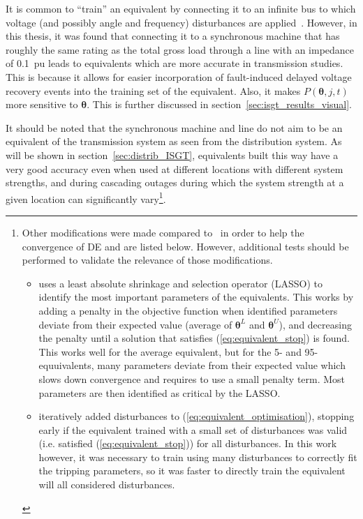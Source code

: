 

It is common to ``train'' an equivalent by connecting it to an infinite bus to which voltage (and possibly angle and frequency) disturbances are applied~\cite{ChaspierreThesis, CIGREloadModels, fulgencio}. However, in this thesis, it was found that connecting it to a synchronous machine that has roughly the same rating as the total gross load through a line with an impedance of 0.1~pu leads to equivalents which are more accurate in transmission studies. This is because it allows for easier incorporation of fault-induced delayed voltage recovery events into the training set of the equivalent. Also, it makes \(P(\bm{\theta}, j, t)\) more sensitive to \(\bm{\theta}\). This is further discussed in section~\ref{sec:isgt_results_visual}.

It should be noted that the synchronous machine and line do not aim to be an equivalent of the transmission system as seen from the distribution system. As will be shown in section~\ref{sec:distrib_ISGT}, equivalents built this way have a very good accuracy even when used at different locations with different system strengths, and during cascading outages during which the system strength at a given location can significantly vary\footnote{Other modifications were made compared to~\cite{ChaspierreThesis} in order to help the convergence of DE and are listed below. However, additional tests should be performed to validate the relevance of those modifications.
\begin{itemize}
    \item \cite{ChaspierreThesis} uses a least absolute shrinkage and selection operator (LASSO) to identify the most important parameters of the equivalents. This works by adding a penalty in the objective function when identified parameters deviate from their expected value (average of \(\bm{\theta}^L\) and \(\bm{\theta}^U\)), and decreasing the penalty until a solution that satisfies (\ref{eq:equivalent_stop}) is found. This works well for the average equivalent, but for the 5- and 95-equuivalents, many parameters deviate from their expected value which slows down convergence and requires to use a small penalty term. Most parameters are then identified as critical by the LASSO.
    \item \cite{ChaspierreThesis} iteratively added disturbances to (\ref{eq:equivalent_optimisation}), stopping early if the equivalent trained with a small set of disturbances was valid (i.e. satisfied (\ref{eq:equivalent_stop})) for all disturbances. In this work however, it was necessary to train using many disturbances to correctly fit the tripping parameters, so it was faster to directly train the equivalent will all considered disturbances.
\end{itemize}
}.


